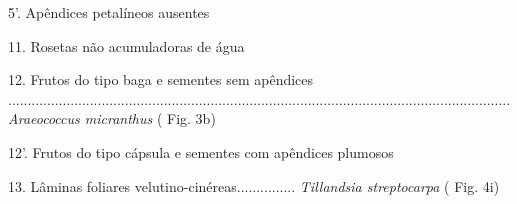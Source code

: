 \begin{customList1}
\begin{customList1}
\item \par{}5'.\allowbreak{} Apêndices petalíneos ausentes
\begin{customList1}
\item \par{}11.\allowbreak{} Rosetas não acumuladoras de água
\begin{customList1}
\item \par{}12.\allowbreak{} Frutos do tipo baga e sementes sem apêndices .\allowbreak{}.\allowbreak{}.\allowbreak{}.\allowbreak{}.\allowbreak{}.\allowbreak{}.\allowbreak{}.\allowbreak{}.\allowbreak{}.\allowbreak{}.\allowbreak{}.\allowbreak{}.\allowbreak{}.\allowbreak{}.\allowbreak{}.\allowbreak{}.\allowbreak{}.\allowbreak{}.\allowbreak{}.\allowbreak{}.\allowbreak{}.\allowbreak{}.\allowbreak{}.\allowbreak{}.\allowbreak{}.\allowbreak{}.\allowbreak{}.\allowbreak{}.\allowbreak{}.\allowbreak{}.\allowbreak{}.\allowbreak{}.\allowbreak{}.\allowbreak{}.\allowbreak{}.\allowbreak{}.\allowbreak{}.\allowbreak{}.\allowbreak{}.\allowbreak{}.\allowbreak{}.\allowbreak{}.\allowbreak{}.\allowbreak{}.\allowbreak{}.\allowbreak{}.\allowbreak{}.\allowbreak{}.\allowbreak{}.\allowbreak{}.\allowbreak{}.\allowbreak{}.\allowbreak{}.\allowbreak{}.\allowbreak{}.\allowbreak{}.\allowbreak{}.\allowbreak{}.\allowbreak{}.\allowbreak{}.\allowbreak{}.\allowbreak{}.\allowbreak{}.\allowbreak{}.\allowbreak{}.\allowbreak{}.\allowbreak{}.\allowbreak{}.\allowbreak{}.\allowbreak{}.\allowbreak{}.\allowbreak{}.\allowbreak{}.\allowbreak{}.\allowbreak{}.\allowbreak{}.\allowbreak{}.\allowbreak{}.\allowbreak{}.\allowbreak{}.\allowbreak{}.\allowbreak{}.\allowbreak{}.\allowbreak{}.\allowbreak{}.\allowbreak{}.\allowbreak{}.\allowbreak{}.\allowbreak{}.\allowbreak{}.\allowbreak{}.\allowbreak{}.\allowbreak{}.\allowbreak{}.\allowbreak{}.\allowbreak{}.\allowbreak{}.\allowbreak{}.\allowbreak{}.\allowbreak{}.\allowbreak{}.\allowbreak{}.\allowbreak{}.\allowbreak{}.\allowbreak{}.\allowbreak{}.\allowbreak{}.\allowbreak{}.\allowbreak{}.\allowbreak{}.\allowbreak{}.\allowbreak{}.\allowbreak{}.\allowbreak{}.\allowbreak{}.\allowbreak{}.\allowbreak{}.\allowbreak{}.\allowbreak{}.\allowbreak{}.\allowbreak{}.\allowbreak{}.\allowbreak{}.\allowbreak{}.\allowbreak{}.\allowbreak{}.\allowbreak{}.\allowbreak{}.\allowbreak{} \textit{Araeococcus micranthus} (\allowbreak{} Fig.\allowbreak{} 3b)\allowbreak{}
\item \par{}12'.\allowbreak{} Frutos do tipo cápsula e sementes com apêndices plumosos
\begin{customList1}
\item \par{}13.\allowbreak{} Lâminas foliares velutino-\allowbreak{}cinéreas.\allowbreak{}.\allowbreak{}.\allowbreak{}.\allowbreak{}.\allowbreak{}.\allowbreak{}.\allowbreak{}.\allowbreak{}.\allowbreak{}.\allowbreak{}.\allowbreak{}.\allowbreak{}.\allowbreak{}.\allowbreak{}.\allowbreak{} \textit{Tillandsia streptocarpa} (\allowbreak{} Fig.\allowbreak{} 4i)\allowbreak{}\par{}



\end{customList1}
\end{customList1}
\end{customList1}
\end{customList1}
\end{customList1}
